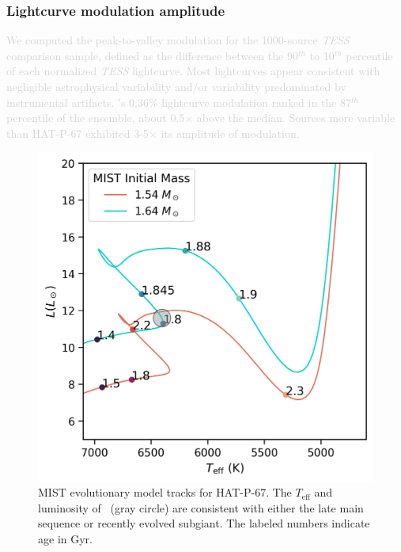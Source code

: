 \documentclass[twocolumn]{aastex631}
\newcommand{\hatp}{\object{HAT-P-67}~}
\begin{document}
\subsubsection{Lightcurve modulation amplitude}
\textcolor{lightgray}{We computed the peak-to-valley modulation for the 1000-source \emph{TESS} comparison sample, defined as the difference between the 90$^{th}$ to 10$^{th}$ percentile of each normalized \emph{TESS} lightcurve.  Most lightcurves appear consistent with negligible astrophysical variability and/or variability predominated by instrumental artifacts. 's 0.36$\%$ lightcurve modulation ranked in the 87$^{th}$ percentile of the ensemble, about 0.5$\times$ above the median.  Sources more variable than HAT-P-67 exhibited 3-5$\times$ its amplitude of modulation.}




\begin{figure}
    \centering
    \includegraphics[width=0.98\linewidth]{figures/MIST_only_HATP.png}
    \caption{MIST evolutionary model tracks for HAT-P-67.  The $T_\mathrm{eff}$ and luminosity of \hatp (gray circle) are consistent with either the late main sequence or recently evolved subgiant.  The labeled numbers indicate age in Gyr.}
    \label{fig:evolTracks}
\end{figure}
\end{document}
